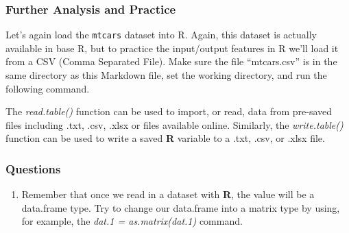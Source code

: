 \documentclass[
]{article}
\newenvironment{Shaded}{\begin{snugshade}}{\end{snugshade}}
\newcommand{\CommentTok}[1]{\textcolor[rgb]{0.56,0.35,0.01}{\textit{#1}}}
\newcommand{\DataTypeTok}[1]{\textcolor[rgb]{0.13,0.29,0.53}{#1}}
\newcommand{\DecValTok}[1]{\textcolor[rgb]{0.00,0.00,0.81}{#1}}
\newcommand{\KeywordTok}[1]{\textcolor[rgb]{0.13,0.29,0.53}{\textbf{#1}}}
\newcommand{\NormalTok}[1]{#1}
\newcommand{\OperatorTok}[1]{\textcolor[rgb]{0.81,0.36,0.00}{\textbf{#1}}}
\newcommand{\OtherTok}[1]{\textcolor[rgb]{0.56,0.35,0.01}{#1}}
\newcommand{\StringTok}[1]{\textcolor[rgb]{0.31,0.60,0.02}{#1}}
\providecommand{\tightlist}{%
  \setlength{\itemsep}{0pt}\setlength{\parskip}{0pt}}
\begin{document}
\hypertarget{further-analysis-and-practice}{%
\subsubsection{Further Analysis and
Practice}\label{further-analysis-and-practice}}

Let's again load the \texttt{mtcars} dataset into R. Again, this dataset
is actually available in base R, but to practice the input/output
features in R we'll load it from a CSV (Comma Separated File). Make sure
the file ``mtcars.csv'' is in the same directory as this Markdown file,
set the working directory, and run the following command.

\begin{Shaded}
\end{Shaded}

The \emph{read.table()} function can be used to import, or read, data
from pre-saved files including .txt, .csv, .xlsx or files available
online. Similarly, the \emph{write.table()} function can be used to
write a saved \textbf{R} variable to a .txt, .csv, or .xlsx file.

\hypertarget{questions-2}{%
\subsubsection{Questions}\label{questions-2}}

\begin{enumerate}
\def\labelenumi{\arabic{enumi}.}
\tightlist
\item
  Remember that once we read in a dataset with \textbf{R}, the value
  will be a data.frame type. Try to change our data.frame into a matrix
  type by using, for example, the \emph{dat.1 = as.matrix(dat.1)}
  command.
\end{enumerate}
\end{document}
